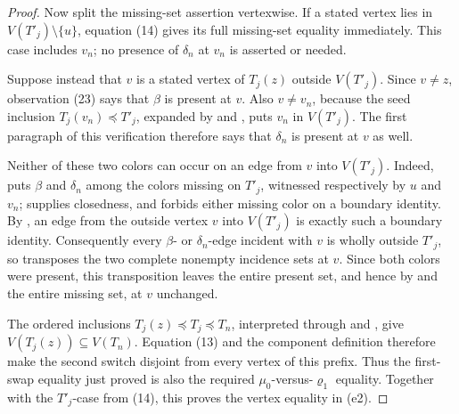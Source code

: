 \begin{proof}
Now split the missing-set assertion vertexwise.  If a stated vertex lies
in \(V(T'_j)\setminus\{u\}\), equation (14) gives its full missing-set
equality immediately.  This case includes \(v_n\); no presence of
\(\delta_n\) at \(v_n\) is asserted or needed.

Suppose instead that \(v\) is a stated vertex of \(T_j(z)\) outside
\(V(T'_j)\).  Since \(v\ne z\), observation (23) says that \(\beta\) is
present at \(v\).  Also \(v\ne v_n\), because the seed inclusion
\(T_j(v_n)\preccurlyeq T'_j\), expanded by
 and
, puts \(v_n\) in \(V(T'_j)\).  The first
paragraph of this verification therefore says that \(\delta_n\) is
present at \(v\) as well.

Neither of these two colors can occur on an edge from \(v\) into
\(V(T'_j)\).  Indeed,  puts \(\beta\) and
\(\delta_n\) among the colors missing on \(T'_j\), witnessed respectively
by \(u\) and \(v_n\);  supplies closedness, and
 forbids either missing color on a boundary
identity.  By , an edge from the outside vertex
\(v\) into \(V(T'_j)\) is exactly such a boundary identity.  Consequently
every \(\beta\)- or \(\delta_n\)-edge incident with \(v\) is wholly outside
\(T'_j\), so  transposes the two complete
nonempty incidence sets at \(v\).  Since both colors were present, this
transposition leaves the entire present set, and hence by
 and  the entire missing set,
at \(v\) unchanged.

The ordered inclusions \(T_j(z)\preccurlyeq T_j\preccurlyeq T_n\),
interpreted through  and
, give
\(V(T_j(z))\subseteq V(T_n)\).  Equation (13) and the component definition
 therefore make the second switch disjoint from
every vertex of this prefix.  Thus the first-swap equality just proved is
also the required \(\mu_0\)-versus-\(\varrho_1\) equality.  Together with
the \(T'_j\)-case from (14), this proves the vertex equality in (e2).


\end{proof}
